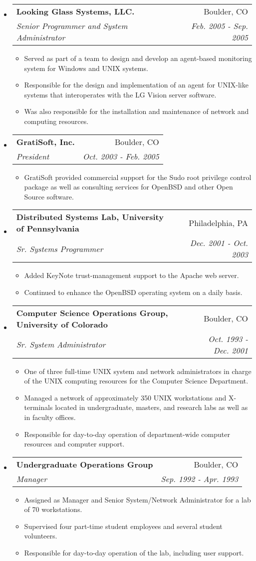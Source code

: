 \documentclass[a4paper,11pt]{article}
\makeatletter
\newcommand{\resitem}[1]{\item #1 \vspace{-2pt}}
\newcommand{\ressubheading}[4]{
\begin{tabular*}{172mm}{l@{\extracolsep{\fill}}r}
		\textbf{#1} & #2 \\
		\textit{#3} & \textit{#4} \\
\end{tabular*}\vspace{-6pt}}
\makeatother
\begin{document}
\begin{itemize}
\item 
	\ressubheading{Looking Glass Systems, LLC.}{Boulder, CO}{Senior Programmer and System Administrator}{Feb. 2005 - Sep. 2005}
	\begin{itemize}
		\resitem{Served as part of a team to design and develop an agent-based monitoring system for Windows and {\sc UNIX} systems.}
		\resitem{Responsible for the design and implementation of an agent for UNIX-like systems that interoperates with the LG Vision server software.}
		\resitem{Was also responsible for the installation and maintenance of network and computing resources.}
	\end{itemize}

\item
	\ressubheading{GratiSoft, Inc.}{Boulder, CO}{President}{Oct. 2003 - Feb. 2005}
	\begin{itemize}
		\resitem{GratiSoft provided commercial support for the Sudo root privilege control package as well as consulting services for OpenBSD and other Open Source software.}
	\end{itemize}

\item
	\ressubheading{Distributed Systems Lab, University of Pennsylvania}{Philadelphia, PA}{Sr. Systems Programmer}{Dec. 2001 - Oct. 2003}
	\begin{itemize}
		\resitem{Added KeyNote trust-management support to the Apache web server.}
		\resitem{Continued to enhance the OpenBSD operating system on a daily basis.}
	\end{itemize}

\item
	\ressubheading{Computer Science Operations Group, University of Colorado}{Boulder, CO}{Sr. System Administrator}{Oct. 1993 - Dec. 2001}
	\begin{itemize}
		\resitem{One of three full-time {\sc UNIX} system and network administrators in charge of the {\sc UNIX} computing resources for the Computer Science Department.}
		\resitem{Managed a network of approximately 350 {\sc UNIX} workstations and X-terminals located in undergraduate, masters, and research labs as well as in faculty offices.}
		\resitem{Responsible for day-to-day operation of department-wide computer resources and computer support.}
	\end{itemize}

\item
	\ressubheading{Undergraduate Operations Group}{Boulder, CO}{Manager}{Sep. 1992 - Apr. 1993}
	\begin{itemize}
		\resitem{Assigned as Manager and Senior System/Network Administrator for a lab of 70 workstations.}
		\resitem{Supervised four part-time student employees and several student volunteers.}
		\resitem{Responsible for day-to-day operation of the lab, including user support.}
	\end{itemize}


\end{itemize}
\end{document}
